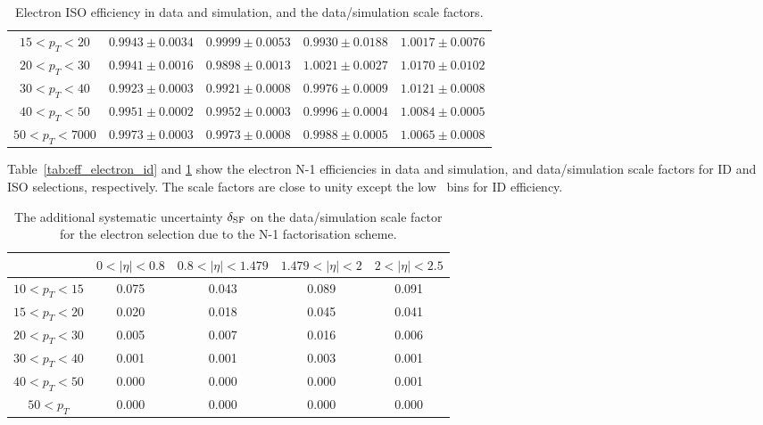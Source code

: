 \begin{table}[!htp]
\begin{center}
\begin{tabular}{c|c|c|c|c}
$ 15 < p_T <  20$ & $0.9943 \pm 0.0034$ & $0.9999 \pm 0.0053$ & $0.9930 \pm 0.0188$ & $1.0017 \pm 0.0076$  \\
$ 20 < p_T <  30$ & $0.9941 \pm 0.0016$ & $0.9898 \pm 0.0013$ & $1.0021 \pm 0.0027$ & $1.0170 \pm 0.0102$  \\
$ 30 < p_T <  40$ & $0.9923 \pm 0.0003$ & $0.9921 \pm 0.0008$ & $0.9976 \pm 0.0009$ & $1.0121 \pm 0.0008$  \\
$ 40 < p_T <  50$ & $0.9951 \pm 0.0002$ & $0.9952 \pm 0.0003$ & $0.9996 \pm 0.0004$ & $1.0084 \pm 0.0005$  \\
$ 50 < p_T < 7000$ & $0.9973 \pm 0.0003$ & $0.9973 \pm 0.0008$ & $0.9988 \pm 0.0005$ & $1.0065 \pm 0.0008$  \\
\hline
\end{tabular}
\caption{Electron ISO efficiency in data and simulation, and the data/simulation scale factors.}
\label{tab:eff_electron_iso}
\end{center}
\end{table}

Table~\ref{tab:eff_electron_id} and \ref{tab:eff_electron_iso} show 
the electron N-1 efficiencies in data and simulation, and data/simulation scale factors 
for ID and ISO selections, respectively. 
The scale factors are close to unity except the low \pt~bins for ID efficiency. 

%
\begin{table}[!htp]
\begin{center}
\begin{tabular}{c|c|c|c|c}
\hline & $0 < |\eta| < 0.8$ & $0.8 < |\eta| < 1.479$ & $1.479 < |\eta| < 2$ & $2 < |\eta| < 2.5$  \\
\hline
$ 10 < p_T <  15$ &    0.075  &     0.043  &     0.089  &     0.091  \\
$ 15 < p_T <  20$ &    0.020  &     0.018  &     0.045  &     0.041  \\
$ 20 < p_T <  30$ &    0.005  &     0.007  &     0.016  &     0.006  \\
$ 30 < p_T <  40$ &    0.001  &     0.001  &     0.003  &     0.001  \\
$ 40 < p_T <  50$ &    0.000  &     0.000  &     0.000  &     0.001  \\
$ 50 < p_T $ &   0.000  &     0.000  &     0.000  &     0.000  \\
\hline
\end{tabular}
\caption{The additional systematic uncertainty $\delta_{\rm{SF}}$ on the data/simulation scale factor 
for the electron selection due to the N-1 factorisation scheme.}
\label{tab:eff_electron_nmsyst}
\end{center}
\end{table}

